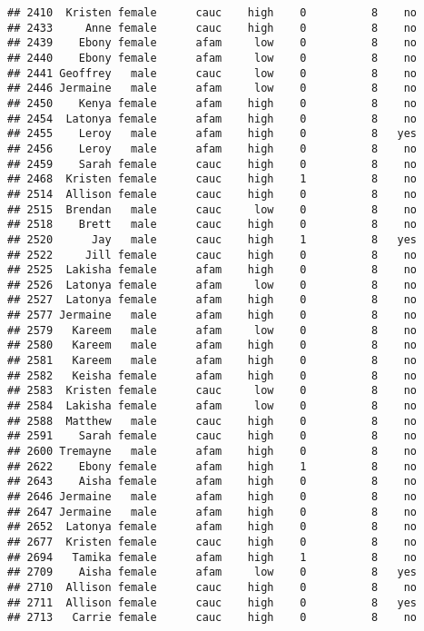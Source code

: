 \documentclass[
]{article}
\begin{document}
\begin{verbatim}
## 2410  Kristen female      cauc    high    0          8    no
## 2433     Anne female      cauc    high    0          8    no
## 2439    Ebony female      afam     low    0          8    no
## 2440    Ebony female      afam     low    0          8    no
## 2441 Geoffrey   male      cauc     low    0          8    no
## 2446 Jermaine   male      afam     low    0          8    no
## 2450    Kenya female      afam    high    0          8    no
## 2454  Latonya female      afam    high    0          8    no
## 2455    Leroy   male      afam    high    0          8   yes
## 2456    Leroy   male      afam    high    0          8    no
## 2459    Sarah female      cauc    high    0          8    no
## 2468  Kristen female      cauc    high    1          8    no
## 2514  Allison female      cauc    high    0          8    no
## 2515  Brendan   male      cauc     low    0          8    no
## 2518    Brett   male      cauc    high    0          8    no
## 2520      Jay   male      cauc    high    1          8   yes
## 2522     Jill female      cauc    high    0          8    no
## 2525  Lakisha female      afam    high    0          8    no
## 2526  Latonya female      afam     low    0          8    no
## 2527  Latonya female      afam    high    0          8    no
## 2577 Jermaine   male      afam    high    0          8    no
## 2579   Kareem   male      afam     low    0          8    no
## 2580   Kareem   male      afam    high    0          8    no
## 2581   Kareem   male      afam    high    0          8    no
## 2582   Keisha female      afam    high    0          8    no
## 2583  Kristen female      cauc     low    0          8    no
## 2584  Lakisha female      afam     low    0          8    no
## 2588  Matthew   male      cauc    high    0          8    no
## 2591    Sarah female      cauc    high    0          8    no
## 2600 Tremayne   male      afam    high    0          8    no
## 2622    Ebony female      afam    high    1          8    no
## 2643    Aisha female      afam    high    0          8    no
## 2646 Jermaine   male      afam    high    0          8    no
## 2647 Jermaine   male      afam    high    0          8    no
## 2652  Latonya female      afam    high    0          8    no
## 2677  Kristen female      cauc    high    0          8    no
## 2694   Tamika female      afam    high    1          8    no
## 2709    Aisha female      afam     low    0          8   yes
## 2710  Allison female      cauc    high    0          8    no
## 2711  Allison female      cauc    high    0          8   yes
## 2713   Carrie female      cauc    high    0          8    no

\end{verbatim}
\end{document}
